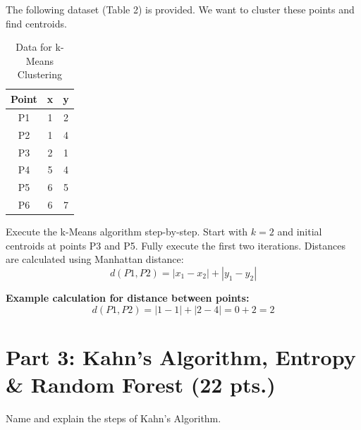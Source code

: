 \documentclass[12pt]{article}
\begin{document}
    \begin{ejercicio}
        The following dataset (Table 2) is provided. We want to cluster these points and find centroids.

        \begin{table}[h!]
        \centering
        \begin{tabular}{|c|c|c|}
        \hline
        \textbf{Point} & \textbf{x} & \textbf{y} \\ \hline
        P1 & 1 & 2 \\ \hline
        P2 & 1 & 4 \\ \hline
        P3 & 2 & 1 \\ \hline
        P4 & 5 & 4 \\ \hline
        P5 & 6 & 5 \\ \hline
        P6 & 6 & 7 \\ \hline
        \end{tabular}
        \caption{Data for k-Means Clustering}
        \end{table}

        Execute the k-Means algorithm step-by-step. Start with $k = 2$ and initial centroids at points P3 and P5. Fully execute the first two iterations. Distances are calculated using Manhattan distance:
        \[ d(P1, P2) = |x_1 - x_2| + |y_1 - y_2| \]

        \textbf{Example calculation for distance between points:}
        \[ d(P1, P2) = |1 - 1| + |2 - 4| = 0 + 2 = 2 \]
    \end{ejercicio}

    \newpage

    \section*{Part 3: Kahn's Algorithm, Entropy \& Random Forest (22 pts.)}

    \begin{ejercicio}
        Name and explain the steps of Kahn's Algorithm.
    \end{ejercicio}
\end{document}

